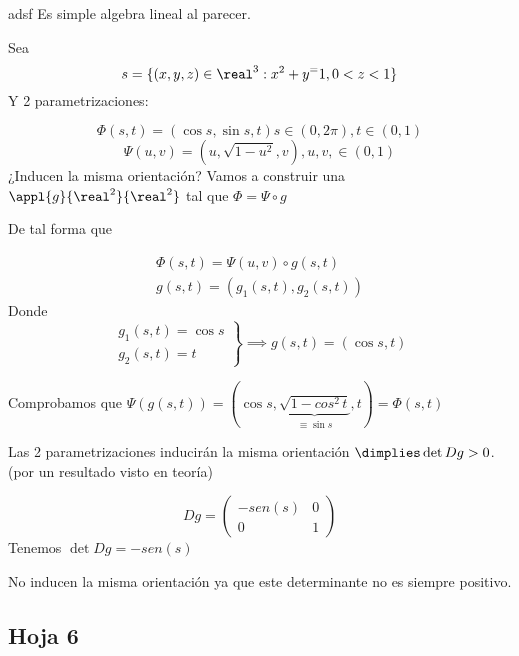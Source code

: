 \begin{problem}[10]

adsf
\solution
Es simple algebra lineal al parecer.
\end{problem}

\begin{problem}[11]
Sea \[s=\{(x,y,z)\in\real^3: x^2+y^=1, 0<z<1\}\]
Y 2 parametrizaciones:

\[\Phi(s,t)  = (\cos s,\sin s,t) s\in(0,2\pi),t\in(0,1)\]
\[\Psi(u,v)=(u,\sqrt{1-u^2},v),u,v,\in(0,1)\]
¿Inducen la misma orientación?
\solution
Vamos a construir una $\appl{g}{\real^2}{\real^2}$ tal que $\Phi = \Psi \circ g$

De tal forma que

\[\begin{array}{c}
\Phi(s,t) = \Psi(u,v)\circ g(s,t)\\
g(s,t) = (g_1(s,t),g_2(s,t))
\end{array}\]
Donde \[\left.\begin{array}{c}
g_1 (s,t) = \cos s\\
g_2(s,t) = t
\end{array}\right\}\implies g(s,t)= (\cos s,t)\]

Comprobamos que $\Psi(g(s,t)) = (\cos s,\underbrace{\sqrt{1-cos^2\,t}}_{\equiv \sin s},t) = \Phi(s,t)$

Las 2 parametrizaciones inducirán la misma orientación $\dimplies \det Dg > 0$. (por un resultado visto en teoría)

\[Dg = \begin{pmatrix}
-sen(s)&0\\0&1
\end{pmatrix}\]
Tenemos $\det Dg = -sen(s)$

No inducen la misma orientación ya que este determinante no es siempre positivo.

\end{problem}

\subsection{Hoja 6}

